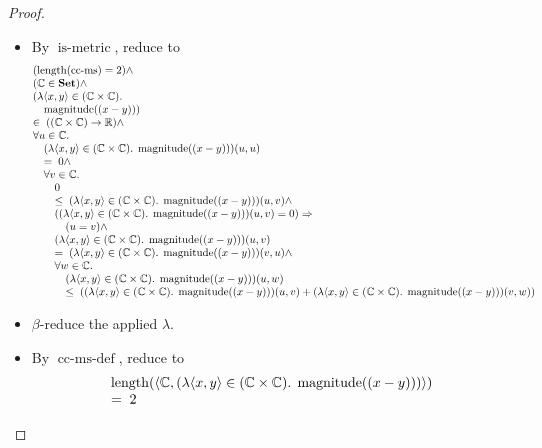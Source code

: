 \documentclass[11pt]{article}
\theoremstyle{plain}
\begin{document}
\begin{proof}
\begin{itemize}[leftmargin=2.8em, itemsep=4pt, parsep=1pt]
  \item[\textbf{4}] By $\operatorname{is\text{-}metric}$, reduce to
\begin{equation*}
\begin{array}{@{}l@{}} (\operatorname{length}(\operatorname{cc\text{-}ms}) = 2) \wedge \\ (\mathbb{C} \in \mathbf{Set}) \wedge \\ (\lambda \langle x, y \rangle \in (\mathbb{C} \times \mathbb{C}).\; \\ \quad \operatorname{magnitude}((x - y))) \\ \in\; ((\mathbb{C} \times \mathbb{C}) \to \mathbb{R}) \wedge \\ \forall u \in \mathbb{C}. \\ \quad (\lambda \langle x, y \rangle \in (\mathbb{C} \times \mathbb{C}).\; \operatorname{magnitude}((x - y)))(u, u) \\ \quad =\; 0 \wedge \\ \quad \forall v \in \mathbb{C}. \\ \quad \quad 0 \\ \quad \quad \leq\; (\lambda \langle x, y \rangle \in (\mathbb{C} \times \mathbb{C}).\; \operatorname{magnitude}((x - y)))(u, v) \wedge \\ \quad \quad ((\lambda \langle x, y \rangle \in (\mathbb{C} \times \mathbb{C}).\; \operatorname{magnitude}((x - y)))(u, v) = 0) \Rightarrow  \\ \quad \quad \quad (u = v) \wedge \\ \quad \quad (\lambda \langle x, y \rangle \in (\mathbb{C} \times \mathbb{C}).\; \operatorname{magnitude}((x - y)))(u, v) \\ \quad \quad =\; (\lambda \langle x, y \rangle \in (\mathbb{C} \times \mathbb{C}).\; \operatorname{magnitude}((x - y)))(v, u) \wedge \\ \quad \quad \forall w \in \mathbb{C}. \\ \quad \quad \quad (\lambda \langle x, y \rangle \in (\mathbb{C} \times \mathbb{C}).\; \operatorname{magnitude}((x - y)))(u, w) \\ \quad \quad \quad \leq\; ((\lambda \langle x, y \rangle \in (\mathbb{C} \times \mathbb{C}).\; \operatorname{magnitude}((x - y)))(u, v) + (\lambda \langle x, y \rangle \in (\mathbb{C} \times \mathbb{C}).\; \operatorname{magnitude}((x - y)))(v, w)) \end{array}
\end{equation*}

  \item[\textbf{5}] $\beta$-reduce the applied $\lambda$.
  \item[\textbf{6--17}] By $\operatorname{cc\text{-}ms\text{-}def}$, reduce to
\begin{equation*}
\begin{array}{@{}l@{}} \operatorname{length}(\langle \mathbb{C}, (\lambda \langle x, y \rangle \in (\mathbb{C} \times \mathbb{C}).\; \operatorname{magnitude}((x - y))) \rangle) \\ =\; 2 \end{array}
\end{equation*}


\end{itemize}
\end{proof}
\end{document}
